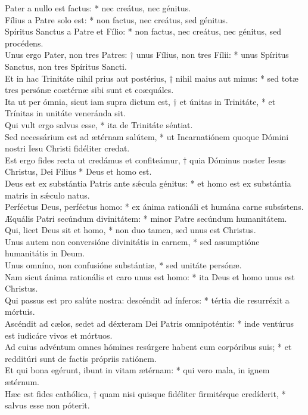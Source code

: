 {	Pater a nullo est factus: * nec creátus, nec génitus. \\
	Fílius a Patre solo est: * non factus, nec creátus, sed génitus. \\
	Spíritus Sanctus a Patre et Fílio: * non factus, nec creátus, nec génitus, sed procédens. \\
	Unus ergo Pater, non tres Patres: † unus Fílius, non tres Fílii: * unus Spíritus Sanctus, non tres Spíritus Sancti. \\
	Et in hac Trinitáte nihil prius aut postérius, † nihil maius aut minus: * sed totæ tres persónæ coætérnæ sibi sunt et coæquáles. \\
	Ita ut per ómnia, sicut iam supra dictum est, † et únitas in Trinitáte, * et Trínitas in unitáte veneránda sit. \\
	Qui vult ergo salvus esse, * ita de Trinitáte séntiat. \\
	Sed necessárium est ad ætérnam salútem, * ut Incarnatiónem quoque Dómini nostri Iesu Christi fidéliter credat. \\
	Est ergo fides recta ut credámus et confiteámur, † quia Dóminus noster Iesus Christus, Dei Fílius * Deus et homo est. \\
	Deus est ex substántia Patris ante sǽcula génitus: * et homo est ex substántia matris in sǽculo natus. \\
	Perféctus Deus, perféctus homo: * ex ánima rationáli et humána carne subsístens. \\
	Æquális Patri secúndum divinitátem: * minor Patre secúndum humanitátem. \\
	Qui, licet Deus sit et homo, * non duo tamen, sed unus est Christus. \\
	Unus autem non conversióne divinitátis in carnem, * sed assumptióne humanitátis in Deum. \\
	Unus omníno, non confusióne substántiæ, * sed unitáte persónæ. \\
	Nam sicut ánima rationális et caro unus est homo: * ita Deus et homo unus est Christus. \\
	Qui passus est pro salúte nostra: descéndit ad ínferos: * tértia die resurréxit a mórtuis. \\
	Ascéndit ad cælos, sedet ad déxteram Dei Patris omnipoténtis: * inde ventúrus est iudicáre vivos et mórtuos. \\
	Ad cuius advéntum omnes hómines resúrgere habent cum corpóribus suis; * et redditúri sunt de factis própriis ratiónem. \\
	Et qui bona egérunt, ibunt in vitam ætérnam: * qui vero mala, in ignem ætérnum. \\
	Hæc est fides cathólica, † quam nisi quisque fidéliter firmitérque credíderit, * salvus esse non póterit. \\
}

